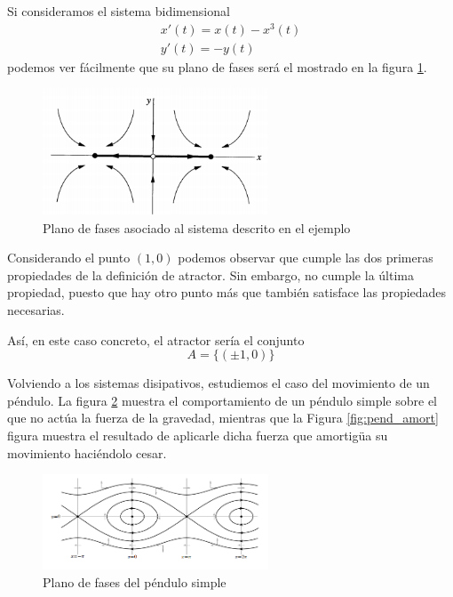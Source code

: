 \begin{example}
Si consideramos el sistema bidimensional
\[\begin{array}{l}
x'(t) = x(t)-x^3(t) \\
y'(t) = -y(t)
\end{array}\]
podemos ver fácilmente que su plano de fases será el mostrado en la figura \ref{fig:planoFasesAtractorEjemplo}.
\begin{figure}[H]
\centering
\includegraphics[width = 0.6\textwidth]{img/atractorExample.png}
\caption{Plano de fases asociado al sistema descrito en el ejemplo}
\label{fig:planoFasesAtractorEjemplo}
\end{figure}

Considerando el punto $(1,0)$ podemos observar que cumple las dos primeras propiedades de la definición de atractor. Sin embargo, no cumple la última propiedad, puesto que hay otro punto más que también satisface las propiedades necesarias.

Así, en este caso concreto, el atractor sería el conjunto
\[A=\{(\pm 1, 0)\}\]
\end{example}


Volviendo a los sistemas disipativos, estudiemos el caso del movimiento de un péndulo. La figura \ref{fig:pend_simple} muestra el comportamiento de un péndulo simple sobre el que no actúa la fuerza de la gravedad, mientras que la Figura \ref{fig:pend_amort} figura muestra el resultado de aplicarle dicha fuerza que amortigüa su movimiento haciéndolo cesar.

\begin{figure}[hbtp]
\centering
\includegraphics[width = 0.6\textwidth]{img/pend_simple.jpg}
\caption{Plano de fases del péndulo simple}
\label{fig:pend_simple}
\end{figure}

